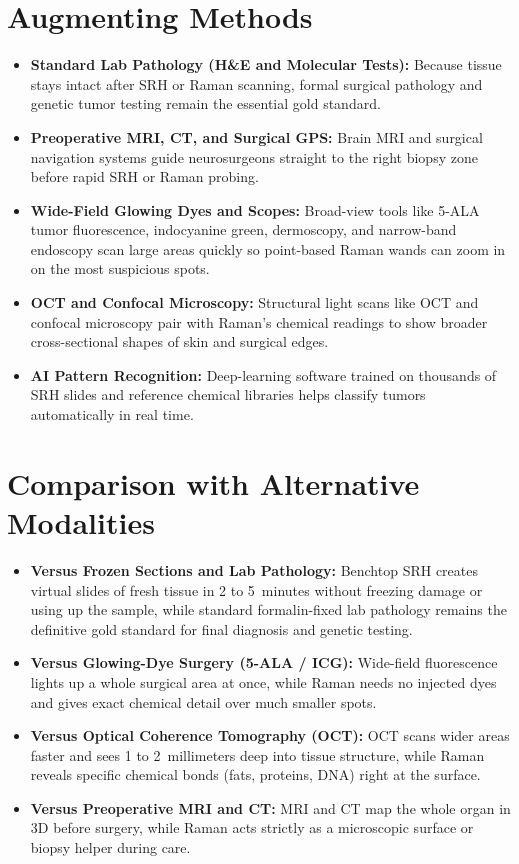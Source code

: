 \section{Augmenting Methods}
\begin{itemize}
  \item \textbf{Standard Lab Pathology (H\&E and Molecular Tests):} Because tissue stays intact after SRH or Raman scanning, formal surgical pathology and genetic tumor testing remain the essential gold standard.
  \item \textbf{Preoperative MRI, CT, and Surgical GPS:} Brain MRI and surgical navigation systems guide neurosurgeons straight to the right biopsy zone before rapid SRH or Raman probing.
  \item \textbf{Wide-Field Glowing Dyes and Scopes:} Broad-view tools like 5-ALA tumor fluorescence, indocyanine green, dermoscopy, and narrow-band endoscopy scan large areas quickly so point-based Raman wands can zoom in on the most suspicious spots.
  \item \textbf{OCT and Confocal Microscopy:} Structural light scans like OCT and confocal microscopy pair with Raman's chemical readings to show broader cross-sectional shapes of skin and surgical edges.
  \item \textbf{AI Pattern Recognition:} Deep-learning software trained on thousands of SRH slides and reference chemical libraries helps classify tumors automatically in real time.
\end{itemize}

\section{Comparison with Alternative Modalities}
\begin{itemize}
  \item \textbf{Versus Frozen Sections and Lab Pathology:} Benchtop SRH creates virtual slides of fresh tissue in 2 to 5~minutes without freezing damage or using up the sample, while standard formalin-fixed lab pathology remains the definitive gold standard for final diagnosis and genetic testing.
  \item \textbf{Versus Glowing-Dye Surgery (5-ALA / ICG):} Wide-field fluorescence lights up a whole surgical area at once, while Raman needs no injected dyes and gives exact chemical detail over much smaller spots.
  \item \textbf{Versus Optical Coherence Tomography (OCT):} OCT scans wider areas faster and sees 1 to 2~millimeters deep into tissue structure, while Raman reveals specific chemical bonds (fats, proteins, DNA) right at the surface.
  \item \textbf{Versus Preoperative MRI and CT:} MRI and CT map the whole organ in 3D before surgery, while Raman acts strictly as a microscopic surface or biopsy helper during care.
\end{itemize}


